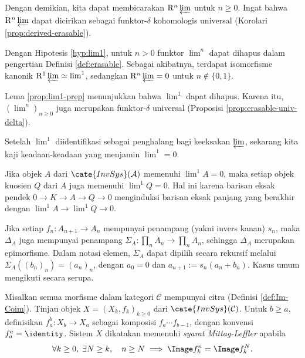 Dengan demikian, kita dapat membicarakan
$\mathrm{R}^n \varprojlim$ untuk $n \geq 0$. Ingat bahwa
$\mathrm{R}^n \varprojlim$ dapat dicirikan sebagai funktor-$\delta$
kohomologis universal (Korolari \ref{prop:derived-erasable}).

\begin{teorema}[S.\ Eilenberg]\label{prop:lim1}
Dengan Hipotesis \ref{hyp:lim1}, untuk $n > 0$ funktor
$\lim\nolimits^n$ dapat dihapus dalam pengertian Definisi
\ref{def:erasable}. Sebagai akibatnya, terdapat isomorfisme kanonik
$\mathrm{R}^1 \varprojlim \simeq \lim^1$, sedangkan
$\mathrm{R}^n \varprojlim = 0$ untuk $n \notin \{0, 1\}$.
\end{teorema}
\begin{bukti}
Lema \ref{prop:lim1-prep} menunjukkan bahwa $\lim^1$ dapat dihapus.
Karena itu, $(\lim^n)_{n \geq 0}$ juga merupakan funktor-$\delta$
universal (Proposisi \ref{prop:erasable-univ-delta}).
\end{bukti}

Setelah $\lim^1$ diidentifikasi sebagai penghalang bagi keeksakan
$\varprojlim$, sekarang kita kaji keadaan-keadaan yang menjamin
$\lim^1 = 0$.

\begin{contoh}\label{eg:quotient-lim1-0}
Jika objek $A$ dari $\cate{InvSys}(\mathcal{A})$ memenuhi
$\lim^1 A = 0$, maka setiap objek kuosien $Q$ dari $A$ juga memenuhi
$\lim^1 Q = 0$. Hal ini karena barisan eksak pendek
$0 \to K \to A \to Q \to 0$ menginduksi barisan eksak panjang yang
berakhir dengan $\lim^1 A \to \lim^1 Q \to 0$.
\end{contoh}

\begin{contoh}\label{eg:lim1-section}
Jika setiap $f_n: A_{n+1} \to A_n$ mempunyai penampang (yakni invers
kanan) $s_n$, maka $\Delta_A$ juga mempunyai penampang
$\Sigma_A: \prod_n A_n \to \prod_n A_n$, sehingga $\Delta_A$
merupakan epimorfisme. Dalam notasi elemen, $\Sigma_A$ dapat dipilih
secara rekursif melalui
$\Sigma_A((b_n)_n) = (a_n)_n$, dengan $a_0 = 0$ dan
$a_{n+1} := s_n\left( a_n + b_n \right)$. Kasus umum mengikuti secara
serupa.
\end{contoh}

\begin{definisi}\label{def:ML}
Misalkan semua morfisme dalam kategori $\mathcal{C}$ mempunyai citra
(Definisi \ref{def:Im-Coim}). Tinjau objek
$X = (X_k, f_k)_{k \geq 0}$ dari $\cate{InvSys}(\mathcal{C})$.
Untuk $b \geq a$, definisikan $f^b_a: X_b \to X_a$ sebagai komposisi
$f_a \cdots f_{b-1}$, dengan konvensi $f^a_a = \identity$. Sistem $X$
dikatakan memenuhi \emph{syarat Mittag-Leffler} apabila
\[ \forall k \geq 0, \; \exists N \geq k, \quad n \geq N \implies \Image f^n_k = \Image f^N_k. \]
\end{definisi}

